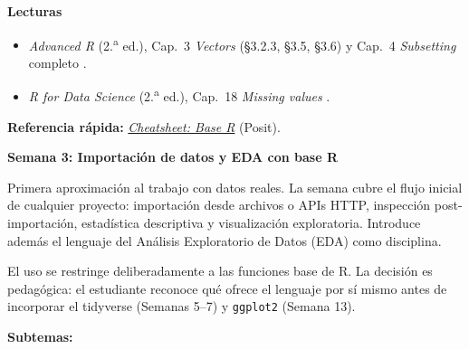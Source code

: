 \documentclass[11pt,letterpaper]{article}
\newcommand{\semana}[2]{%
  \bigskip%
  {\color{main}\Large\bfseries Semana #1: #2\par}%
  \smallskip%
}
\newcommand{\cheatsheet}[2]{%
  \href{https://rstudio.github.io/cheatsheets/#1.pdf}{\textit{Cheatsheet: #2}}%
}
\begin{document}
\medskip
\noindent\textbf{Lecturas}
\begin{itemize}[leftmargin=*, itemsep=1pt]
    \item \textit{Advanced R} (2.\textsuperscript{a} ed.), Cap.\ 3 \textit{Vectors} (§3.2.3, §3.5, §3.6) y Cap.\ 4 \textit{Subsetting} completo \cite{wickham2019advr}.
    \item \textit{R for Data Science} (2.\textsuperscript{a} ed.), Cap.\ 18 \textit{Missing values} \cite{wickham2023r4ds}.
\end{itemize}

\medskip
\noindent\textbf{Referencia rápida:} \cheatsheet{base-r}{Base R} (Posit).

\semana{3}{Importación de datos y EDA con base R}

Primera aproximación al trabajo con datos reales. La semana cubre el flujo inicial de cualquier proyecto: importación desde archivos o APIs HTTP, inspección post-importación, estadística descriptiva y visualización exploratoria. Introduce además el lenguaje del Análisis Exploratorio de Datos (EDA) como disciplina.

El uso se restringe deliberadamente a las funciones base de R. La decisión es pedagógica: el estudiante reconoce qué ofrece el lenguaje por sí mismo antes de incorporar el tidyverse (Semanas 5--7) y \texttt{ggplot2} (Semana 13).

\textbf{Subtemas:}
\end{document}
